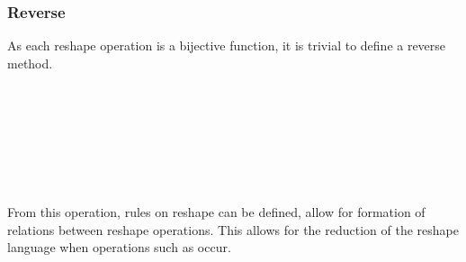 \subsubsection{Reverse}
As each reshape operation is a bijective function, it is trivial to define a reverse
method.
\begin{code}%
%
\>[2]\AgdaSpace{}%
\AgdaSymbol{:}\AgdaSpace{}%
\AgdaSpace{}%
\AgdaSpace{}%
\AgdaSpace{}%
\AgdaSpace{}%
\AgdaSpace{}%
\AgdaSpace{}%
\<%
\\
%
\>[2]\AgdaSpace{}%
\AgdaSpace{}%
\AgdaSymbol{=}\AgdaSpace{}%
\<%
\\
%
\>[2]\AgdaSpace{}%
\AgdaSymbol{(}\AgdaSpace{}%
\AgdaSpace{}%
\AgdaSymbol{)}\AgdaSpace{}%
\AgdaSymbol{=}\AgdaSpace{}%
\AgdaSpace{}%
\AgdaSpace{}%
\AgdaSpace{}%
\AgdaSpace{}%
\<%
\\
%
\>[2]\AgdaSpace{}%
\AgdaSymbol{(}\AgdaSpace{}%
\AgdaSpace{}%
\AgdaSymbol{)}\AgdaSpace{}%
\AgdaSymbol{=}\AgdaSpace{}%
\AgdaSpace{}%
\AgdaSpace{}%
\AgdaSpace{}%
\AgdaSpace{}%
\<%
\\
%
\>[2]\AgdaSpace{}%
\AgdaSpace{}%
\AgdaSymbol{=}\AgdaSpace{}%
\<%
\\
%
\>[2]\AgdaSpace{}%
\AgdaSpace{}%
\AgdaSymbol{=}\AgdaSpace{}%
\<%
\\
%
\>[2]\AgdaSpace{}%
\AgdaSpace{}%
\AgdaSymbol{=}\AgdaSpace{}%
\<%
\end{code}
From this operation, rules on reshape can be defined, allow for formation of
relations between reshape operations.
This allows for the reduction of the reshape language when operations such as 
 occur.
\begin{code}[hide]%
%
\>[2]\AgdaSpace{}%
\AgdaSpace{}%
\<%
\\
%
\>[2]\<%
\end{code}
